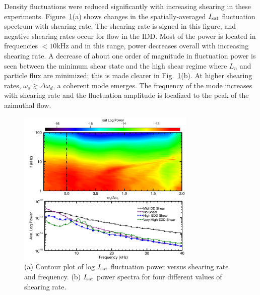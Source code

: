 \documentclass[aps,prl,amsmath,amssymb,preprint,superscriptaddress]{revtex4}
\begin{document}
Density fluctuations were reduced significantly with increasing
shearing in these experiments.  Figure~\ref{fig:powercontour}(a) shows
changes in the spatially-averaged $I_{\rm sat}$ fluctuation spectrum
with shearing rate.  The shearing rate is signed in this figure, and
negative shearing rates occur for flow in the IDD. Most of the power
is located in frequencies $<10$kHz and in this range, power decreases
overall with increasing shearing rate.  A decrease of about one order
of magnitude in fluctuation power is seen between the minimum shear
state and the high shear regime where $L_n$ and particle flux are
minimized; this is made clearer in Fig.~\ref{fig:powercontour}(b).  At
higher shearing rates, $\omega_s \gtrsim \Delta \omega_d$, a coherent
mode emerges.  The frequency of the mode increases with shearing rate
and the fluctuation amplitude is localized to the peak of the
azimuthal flow.

\begin{figure}[!htbp]
\centerline{
\includegraphics[width=8.5cm]{powercontour.pdf}}
\caption{\label{fig:powercontour} (a) Contour plot of log $I_{\rm
    sat}$ fluctuation power versus shearing rate and frequency. (b)
  $I_{\rm sat}$ power spectra for four different values of shearing rate.}
\end{figure}
\end{document}
